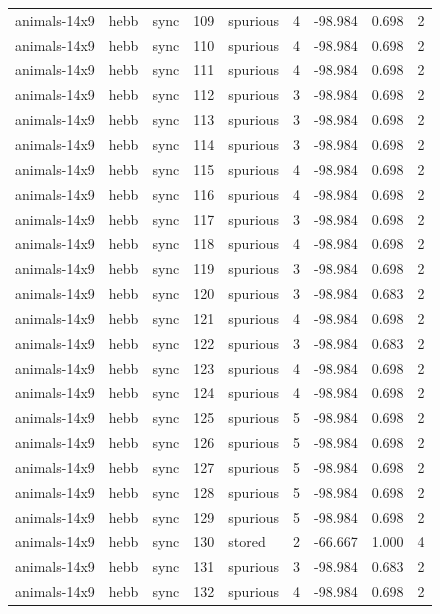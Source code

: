 \begin{tabular}{lllrlrrrr}
animals-14x9 & hebb & sync & 109 & spurious & 4 & -98.984 & 0.698 & 2 \\
animals-14x9 & hebb & sync & 110 & spurious & 4 & -98.984 & 0.698 & 2 \\
animals-14x9 & hebb & sync & 111 & spurious & 4 & -98.984 & 0.698 & 2 \\
animals-14x9 & hebb & sync & 112 & spurious & 3 & -98.984 & 0.698 & 2 \\
animals-14x9 & hebb & sync & 113 & spurious & 3 & -98.984 & 0.698 & 2 \\
animals-14x9 & hebb & sync & 114 & spurious & 3 & -98.984 & 0.698 & 2 \\
animals-14x9 & hebb & sync & 115 & spurious & 4 & -98.984 & 0.698 & 2 \\
animals-14x9 & hebb & sync & 116 & spurious & 4 & -98.984 & 0.698 & 2 \\
animals-14x9 & hebb & sync & 117 & spurious & 3 & -98.984 & 0.698 & 2 \\
animals-14x9 & hebb & sync & 118 & spurious & 4 & -98.984 & 0.698 & 2 \\
animals-14x9 & hebb & sync & 119 & spurious & 3 & -98.984 & 0.698 & 2 \\
animals-14x9 & hebb & sync & 120 & spurious & 3 & -98.984 & 0.683 & 2 \\
animals-14x9 & hebb & sync & 121 & spurious & 4 & -98.984 & 0.698 & 2 \\
animals-14x9 & hebb & sync & 122 & spurious & 3 & -98.984 & 0.683 & 2 \\
animals-14x9 & hebb & sync & 123 & spurious & 4 & -98.984 & 0.698 & 2 \\
animals-14x9 & hebb & sync & 124 & spurious & 4 & -98.984 & 0.698 & 2 \\
animals-14x9 & hebb & sync & 125 & spurious & 5 & -98.984 & 0.698 & 2 \\
animals-14x9 & hebb & sync & 126 & spurious & 5 & -98.984 & 0.698 & 2 \\
animals-14x9 & hebb & sync & 127 & spurious & 5 & -98.984 & 0.698 & 2 \\
animals-14x9 & hebb & sync & 128 & spurious & 5 & -98.984 & 0.698 & 2 \\
animals-14x9 & hebb & sync & 129 & spurious & 5 & -98.984 & 0.698 & 2 \\
animals-14x9 & hebb & sync & 130 & stored & 2 & -66.667 & 1.000 & 4 \\
animals-14x9 & hebb & sync & 131 & spurious & 3 & -98.984 & 0.683 & 2 \\
animals-14x9 & hebb & sync & 132 & spurious & 4 & -98.984 & 0.698 & 2 \\

\end{tabular}
